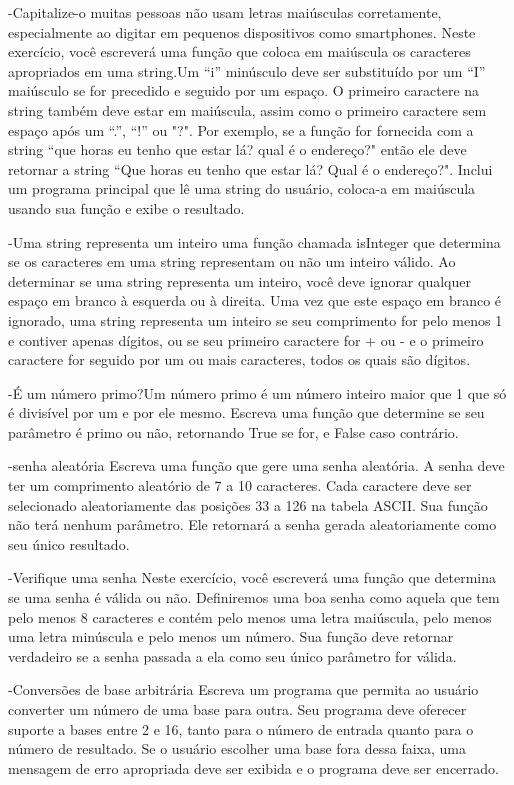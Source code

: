 -Capitalize-o muitas pessoas não usam letras maiúsculas corretamente, especialmente ao digitar em pequenos dispositivos como smartphones. Neste exercício, você escreverá uma função que coloca em maiúscula os caracteres apropriados em uma string.Um “i” minúsculo deve ser substituído por um “I” maiúsculo se for precedido e seguido por um espaço. O primeiro caractere na string também deve estar em maiúscula, assim como o primeiro caractere sem espaço após um “.”, “!” ou "?". Por exemplo, se a função for fornecida com a string “que horas eu tenho que estar lá? qual é o endereço?" então ele deve retornar a string “Que horas eu tenho que estar lá? Qual é o endereço?". Inclui um programa principal que lê uma string do usuário, coloca-a em maiúscula usando sua função e exibe o resultado.

-Uma string representa um inteiro uma função chamada isInteger que determina se os caracteres em uma string representam ou não um inteiro válido. Ao determinar se uma string representa um inteiro, você deve ignorar qualquer espaço em branco à esquerda ou à direita. Uma vez que este espaço em branco é ignorado, uma string representa um inteiro se seu comprimento for pelo menos 1 e contiver apenas dígitos, ou se seu primeiro caractere for + ou - e o primeiro caractere for seguido por um ou mais caracteres, todos os quais são dígitos.

-É um número primo?Um número primo é um número inteiro maior que 1 que só é divisível por um e por ele mesmo. Escreva uma função que determine se seu parâmetro é primo ou não, retornando True se for, e False caso contrário. 

-senha aleatória Escreva uma função que gere uma senha aleatória. A senha deve ter um comprimento aleatório de 7 a 10 caracteres. Cada caractere deve ser selecionado aleatoriamente das posições 33 a 126 na tabela ASCII. Sua função não terá nenhum parâmetro. Ele retornará a senha gerada aleatoriamente como seu único resultado.

-Verifique uma senha Neste exercício, você escreverá uma função que determina se uma senha é válida ou não. Definiremos uma boa senha como aquela que tem pelo menos 8 caracteres e contém pelo menos uma letra maiúscula, pelo menos uma letra minúscula e pelo menos um número. Sua função deve retornar verdadeiro se a senha passada a ela como seu único parâmetro for válida.

-Conversões de base arbitrária Escreva um programa que permita ao usuário converter um número de uma base para outra. Seu programa deve oferecer suporte a bases entre 2 e 16, tanto para o número de entrada quanto para o número de resultado. Se o usuário escolher uma base fora dessa faixa, uma mensagem de erro apropriada deve ser exibida e o programa deve ser encerrado.

